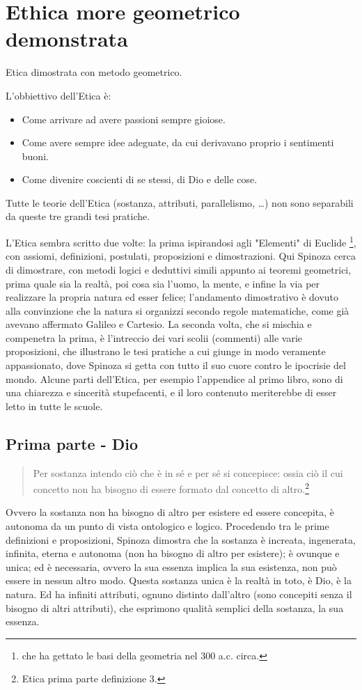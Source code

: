 \chapter{Ethica more geometrico demonstrata}
Etica dimostrata con metodo geometrico.

L'obbiettivo dell'Etica è:\begin{itemize}
	\item Come arrivare ad avere passioni sempre gioiose.
	\item Come avere sempre idee adeguate, da cui derivavano proprio i sentimenti buoni.
	\item Come divenire coscienti di se stessi, di Dio e delle cose.
\end{itemize}

Tutte le teorie dell'Etica (sostanza, attributi, parallelismo, \dots) non sono separabili da queste tre grandi tesi pratiche.

L'Etica sembra scritto due volte: la prima ispirandosi agli "Elementi" di Euclide \footnote{che ha gettato le basi della geometria nel 300 a.c. circa.}, con assiomi, definizioni, postulati, proposizioni e dimostrazioni. Qui Spinoza cerca di dimostrare, con metodi logici e deduttivi simili appunto ai teoremi geometrici, prima quale sia la realtà, poi cosa sia l'uomo, la mente, e infine la via per realizzare la propria natura ed esser felice; l'andamento dimostrativo è dovuto alla convinzione che la natura si organizzi secondo regole matematiche, come già avevano affermato Galileo e Cartesio. La seconda volta, che si mischia e compenetra la prima, è l'intreccio dei vari scolii (commenti) alle varie proposizioni, che illustrano le tesi pratiche a cui giunge in modo veramente appassionato, dove Spinoza si getta con tutto il suo cuore contro le ipocrisie del mondo. Alcune parti dell'Etica, per esempio l'appendice al primo libro, sono di una chiarezza e sincerità stupefacenti, e il loro contenuto meriterebbe di esser letto in tutte le scuole.
\newpage

\section{Prima parte - Dio}
\begin{quotation}
\small	Per sostanza intendo ciò che è in sé e per sé si concepisce: ossia ciò il cui concetto non ha bisogno di essere formato dal concetto di altro.\footnote{Etica prima parte definizione 3.}
\end{quotation}

Ovvero la sostanza non ha bisogno di altro per esistere ed essere concepita, è autonoma da un punto di vista ontologico e logico. Procedendo tra le prime definizioni e proposizioni, Spinoza dimostra che la sostanza è increata, ingenerata, infinita, eterna e autonoma (non ha bisogno di altro per esistere); è ovunque e unica; ed è necessaria, ovvero la sua essenza implica la sua esistenza, non può essere in nessun altro modo.
Questa sostanza unica è la realtà in toto, è Dio, è la natura. 
Ed ha infiniti attributi, ognuno distinto dall'altro (sono concepiti senza il bisogno di altri attributi), che esprimono qualità semplici della sostanza, la sua essenza.

